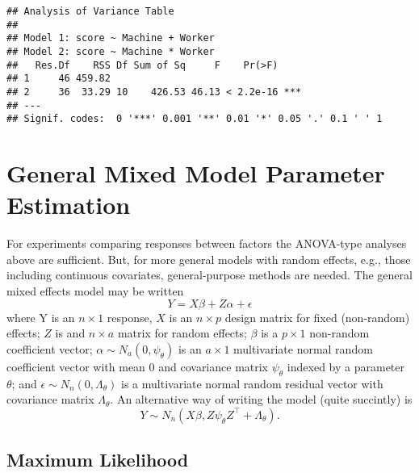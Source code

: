 \documentclass[
]{book}
\begin{document}
\begin{verbatim}
## Analysis of Variance Table
## 
## Model 1: score ~ Machine + Worker
## Model 2: score ~ Machine * Worker
##   Res.Df    RSS Df Sum of Sq     F    Pr(>F)    
## 1     46 459.82                                 
## 2     36  33.29 10    426.53 46.13 < 2.2e-16 ***
## ---
## Signif. codes:  0 '***' 0.001 '**' 0.01 '*' 0.05 '.' 0.1 ' ' 1
\end{verbatim}

\hypertarget{general-mixed-model-parameter-estimation}{%
\section{General Mixed Model Parameter Estimation}\label{general-mixed-model-parameter-estimation}}

For experiments comparing responses between factors the ANOVA-type analyses above are sufficient. But, for more general models with random effects, e.g., those including continuous covariates, general-purpose methods are needed. The general mixed effects model may be written
\[Y = X\beta+ Z\alpha + \epsilon\]
where Y is an \(n\times 1\) response, \(X\) is an \(n \times p\) design matrix for fixed (non-random) effects; \(Z\) is and \(n\times a\) matrix for random effects; \(\beta\) is a \(p\times 1\) non-random coefficient vector; \(\alpha\sim N_a(0, \psi_\theta)\) is an \(a\times 1\) multivariate normal random coefficient vector with mean 0 and covariance matrix \(\psi_\theta\) indexed by a parameter \(\theta\); and \(\epsilon\sim N_n(0, \Lambda_\theta)\) is a multivariate normal random residual vector with covariance matrix \(\Lambda_\theta\). An alternative way of writing the model (quite succintly) is
\[Y\sim N_n(X\beta, Z \psi_\theta Z^\top + \Lambda_\theta).\]

\hypertarget{maximum-likelihood}{%
\subsection{Maximum Likelihood}\label{maximum-likelihood}}
\end{document}
